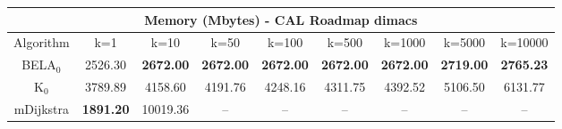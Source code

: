 \begin{tabular}{c|cccccccc}\toprule
\multicolumn{9}{c}{Memory (Mbytes) - CAL Roadmap dimacs}\\ \midrule
Algorithm & k=1 & k=10 & k=50 & k=100 & k=500 & k=1000 & k=5000 & k=10000 \\ \midrule
BELA$_0$ & 2526.30 & \textbf{2672.00} & \textbf{2672.00} & \textbf{2672.00} & \textbf{2672.00} & \textbf{2672.00} & \textbf{2719.00} & \textbf{2765.23} \\
K$_0$ & 3789.89 & 4158.60 & 4191.76 & 4248.16 & 4311.75 & 4392.52 & 5106.50 & 6131.77 \\
mDijkstra & \textbf{1891.20} & 10019.36 & -- & -- & -- & -- & -- & -- \\ \bottomrule 
\end{tabular}
